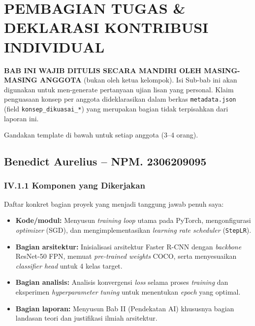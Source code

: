 \documentclass[11pt,a4paper,oneside]{report}
\begin{document}
\chapter{PEMBAGIAN TUGAS \& DEKLARASI KONTRIBUSI INDIVIDUAL}
\label{bab:kontribusi}

\begin{petunjuk}
\textbf{BAB INI WAJIB DITULIS SECARA MANDIRI OLEH MASING-MASING ANGGOTA} (bukan oleh ketua kelompok). Isi Sub-bab ini akan digunakan untuk men-generate pertanyaan ujian lisan yang personal. Klaim penguasaan konsep per anggota dideklarasikan dalam berkas \texttt{metadata.json} (field \texttt{konsep\_dikuasai\_*}) yang merupakan bagian tidak terpisahkan dari laporan ini.

Gandakan template di bawah untuk setiap anggota (3--4 orang).
\end{petunjuk}

\section{Benedict Aurelius -- NPM. 2306209095}

\subsection*{IV.1.1 Komponen yang Dikerjakan}
Daftar konkret bagian proyek yang menjadi tanggung jawab penuh saya:
\begin{itemize}[leftmargin=*]
    \item \textbf{Kode/modul:} Menyusun \textit{training loop} utama pada PyTorch, mengonfigurasi \textit{optimizer} (SGD), dan mengimplementasikan \textit{learning rate scheduler} (\texttt{StepLR}).
    \item \textbf{Bagian arsitektur:} Inisialisasi arsitektur Faster R-CNN dengan \textit{backbone} ResNet-50 FPN, memuat \textit{pre-trained weights} COCO, serta menyesuaikan \textit{classifier head} untuk 4 kelas target.
    \item \textbf{Bagian analisis:} Analisis konvergensi \textit{loss} selama proses \textit{training} dan eksperimen \textit{hyperparameter tuning} untuk menentukan \textit{epoch} yang optimal.
    \item \textbf{Bagian laporan:} Menyusun Bab II (Pendekatan AI) khususnya bagian landasan teori dan justifikasi ilmiah arsitektur.
\end{itemize}
\end{document}
